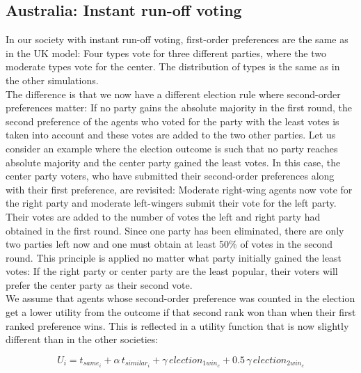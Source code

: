 \documentclass[12pt, a4paper]{article}
\begin{document}
\subsection{Australia: Instant run-off voting} 
In our society with instant run-off voting, first-order preferences are the same as in the UK model: Four types vote for three different parties, where the two moderate types vote for the center. The distribution of types is the same as in the other simulations. \\
The difference is that we now have a different election rule where second-order preferences matter: If no party gains the absolute majority in the first round, the second preference of the agents who voted for the party with the least votes is taken into account and these votes are added to the two other parties. Let us consider an example where the election outcome is such that no party reaches absolute majority and the center party gained the least votes. In this case, the center party voters, who have submitted their second-order preferences along with their first preference, are revisited: Moderate right-wing agents now vote for the right party and moderate left-wingers submit their vote for the left party. Their votes are added to the number of votes the left and right party had obtained in the first round. Since one party has been eliminated, there are only two parties left now and one must obtain at least 50\% of votes in the second round. This principle is applied no matter what party initially gained the least votes: If the right party or center party are the least popular, their voters will prefer the center party as their second vote. \\
We assume that agents whose second-order preference was counted in the election get a lower utility from the outcome if that second rank won than when their first ranked preference wins. This is reflected in a utility function that is now slightly different than in the other societies: %

\begin{equation}
U_i=t_{same_i}+\alpha \, t_{similar_i}+\gamma \, election_{1win_c} + 0.5 \, \gamma \, election_{2win_c}
\end{equation}
\end{document}
